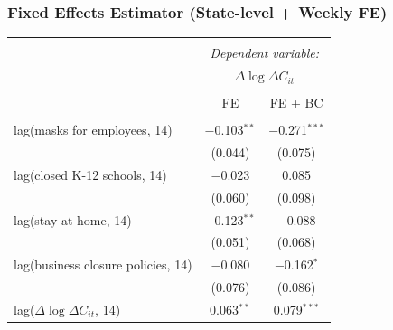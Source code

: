 \documentclass{beamer}
\begin{document}
\begin{frame}
  \frametitle{Fixed Effects Estimator (State-level + Weekly FE)}
  \scriptsize
\begin{tabular}{@{\extracolsep{1pt}}lcc} 
\\[-1.8ex]\hline 
\hline \\[-1.8ex] 
 & \multicolumn{2}{c}{\textit{Dependent variable:}} \\ 
\cline{2-3} 
 & \multicolumn{2}{c}{$\Delta \log \Delta C_{it}$} \\ 
\\[-1.8ex] 
&FE & FE + BC\\ %
\hline \\[-1.8ex] 
\alert{ lag(masks for employees, 14)} &\alert{ $-$0.103$^{**}$} & \alert{$-$0.271$^{***}$} \\ %
  & (0.044) & (0.075)  \\ %
  lag(closed K-12 schools, 14) & $-$0.023 & 0.085  \\ %
  & (0.060) & (0.098)  \\ %
  lag(stay at home, 14) & $-$0.123$^{**}$ & $-$0.088  \\ %
  & (0.051) & (0.068)  \\ %
   lag(business closure policies, 14) & $-$0.080 & $-$0.162$^{*}$ \\ %
   & (0.076) & (0.086) \\ %
  lag($\Delta \log \Delta C_{it}$, 14) & 0.063$^{**}$ & 0.079$^{***}$ \\ %

\end{tabular}
\end{frame}
\end{document}

